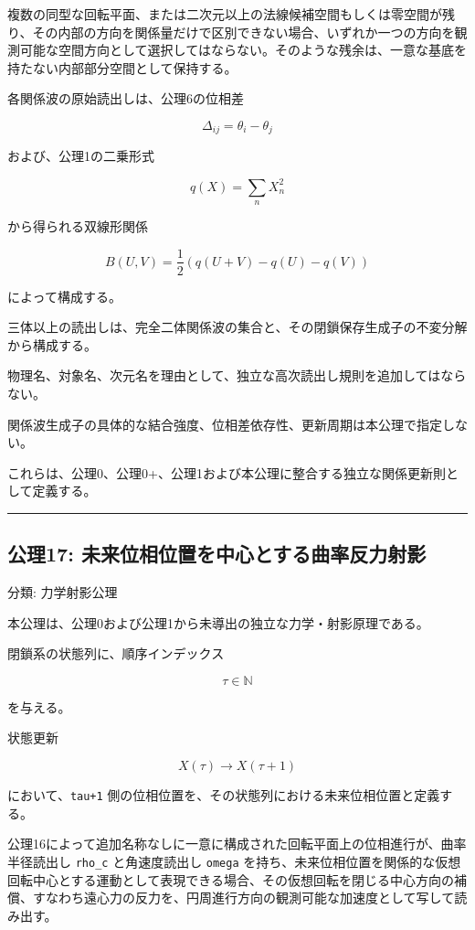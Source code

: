 \documentclass[
  a4paper,
]{ltjsarticle}
\begin{document}
複数の同型な回転平面、または二次元以上の法線候補空間もしくは零空間が残り、その内部の方向を関係量だけで区別できない場合、いずれか一つの方向を観測可能な空間方向として選択してはならない。そのような残余は、一意な基底を持たない内部部分空間として保持する。

各関係波の原始読出しは、公理6の位相差

\[
\Delta_{ij}=\theta_i-\theta_j
\]

および、公理1の二乗形式

\[
q(X)=\sum_n X_n^2
\]

から得られる双線形関係

\[
B(U,V)
=\frac{1}{2}\left(q(U+V)-q(U)-q(V)\right)
\]

によって構成する。

三体以上の読出しは、完全二体関係波の集合と、その閉鎖保存生成子の不変分解から構成する。

物理名、対象名、次元名を理由として、独立な高次読出し規則を追加してはならない。

関係波生成子の具体的な結合強度、位相差依存性、更新周期は本公理で指定しない。

これらは、公理0、公理0+、公理1および本公理に整合する独立な関係更新則として定義する。

\begin{center}\rule{0.5\linewidth}{0.5pt}\end{center}

\subsection{公理17:
未来位相位置を中心とする曲率反力射影}\label{ux516cux740617-ux672aux6765ux4f4dux76f8ux4f4dux7f6eux3092ux4e2dux5fc3ux3068ux3059ux308bux66f2ux7387ux53cdux529bux5c04ux5f71}

分類: 力学射影公理

本公理は、公理0および公理1から未導出の独立な力学・射影原理である。

閉鎖系の状態列に、順序インデックス

\[
\tau\in\mathbb{N}
\]

を与える。

状態更新

\[
X(\tau)\longrightarrow X(\tau+1)
\]

において、\texttt{tau+1}
側の位相位置を、その状態列における未来位相位置と定義する。

公理16によって追加名称なしに一意に構成された回転平面上の位相進行が、曲率半径読出し
\texttt{rho\_c} と角速度読出し \texttt{omega}
を持ち、未来位相位置を関係的な仮想回転中心とする運動として表現できる場合、その仮想回転を閉じる中心方向の補償、すなわち遠心力の反力を、円周進行方向の観測可能な加速度として写して読み出す。
\end{document}
